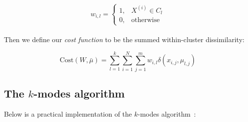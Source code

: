\[ 
    w_{i,l} = \begin{cases}
                1, & X^{(i)} \in C_l \\
                0, & \text{otherwise}
              \end{cases}
\]\\

Then we define our \emph{cost function} to be the summed within-cluster 
dissimilarity:

\begin{equation}
    \text{Cost}(W, \bar{\mu}) = \sum_{l=1}^{k} \sum_{i=1}^{N} 
                                \sum_{j=1}^{m} w_{i,l} 
                                \delta(x_{i,j}, \mu_{l,j})
\end{equation}


\subsection{The \(k\)-modes algorithm}\label{subsec:kmodes}

Below is a practical implementation of the \(k\)-modes algorithm~\cite{Huang98}:

